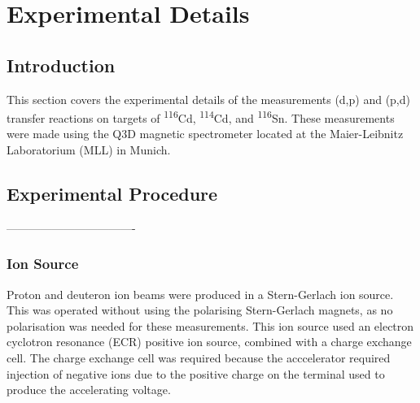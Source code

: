 
\chapter{Experimental Details} %
\graphicspath{{Pictures/}}
\label{Chapter4} %



\section{Introduction}

This section covers the experimental details of the measurements (d,p) and (p,d) transfer reactions on targets of \textsuperscript{116}Cd, \textsuperscript{114}Cd, and \textsuperscript{116}Sn. These measurements were made using the Q3D magnetic spectrometer located at the Maier-Leibnitz Laboratorium (MLL) in Munich. 


\section{Experimental Procedure}


 ----------------------------------
\subsection{Ion Source}
Proton and deuteron ion beams were produced in a Stern-Gerlach ion source\cite{sterngerlach}. This was operated without using the polarising Stern-Gerlach magnets, as no polarisation was needed for these measurements. This ion source used an electron cyclotron resonance (ECR) positive ion source, combined with a charge exchange cell. The charge exchange cell was required because the acccelerator required injection of negative ions due to the positive charge on the terminal used to produce the accelerating voltage.

